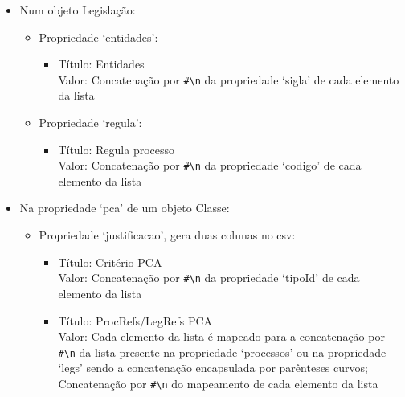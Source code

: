 \begin{itemize}
\begin{itemize}
\begin{itemize}
\begin{itemize}
                      Valor: Concatenação por \verb|#\n| da propriedade `codigo' de cada elemento da lista
                \item Título: Tipo de intervenção no processo \\
                      Valor: Concatenação por \verb|#\n| da propriedade `tipoPar' de cada elemento da lista
            \end{itemize}
        \end{itemize}
        \item Num objeto Legislação:
        \begin{itemize}
            \item Propriedade `entidades':
            \begin{itemize}
                \item Título: Entidades \\
                      Valor: Concatenação por \verb|#\n| da propriedade `sigla' de cada elemento da lista
            \end{itemize}
            \item Propriedade `regula':
            \begin{itemize}
                \item Título: Regula processo \\
                      Valor: Concatenação por \verb|#\n| da propriedade `codigo' de cada elemento da lista
            \end{itemize}
        \end{itemize}
        \item Na propriedade `pca' de um objeto Classe:
        \begin{itemize}
            \item Propriedade `justificacao', gera duas colunas no \acrshort{csv}:
            \begin{itemize}
                \item Título: Critério PCA \\
                      Valor: Concatenação por \verb|#\n| da propriedade `tipoId' de cada elemento da lista
                \item Título: ProcRefs/LegRefs PCA \\
                      Valor: Cada elemento da lista é mapeado para a concatenação por \verb|#\n| da lista presente na propriedade `processos' ou na propriedade `legs' sendo a concatenação encapsulada por parênteses curvos; Concatenação por \verb|#\n| do mapeamento de cada elemento da lista               

\end{itemize}
\end{itemize}
\end{itemize}
\end{itemize}
